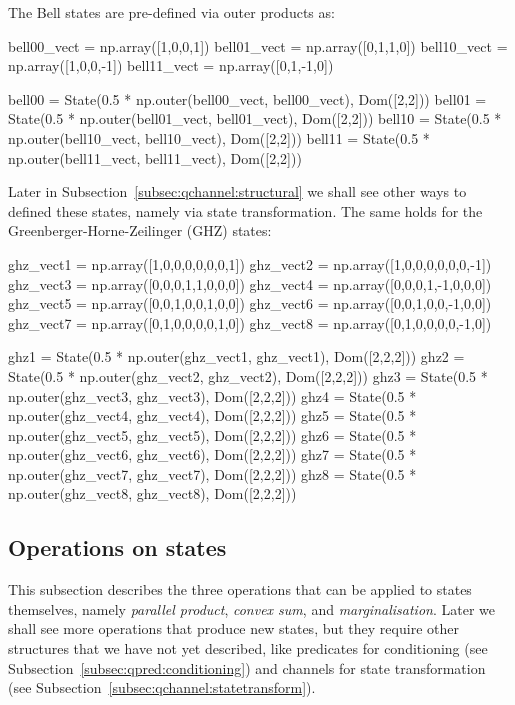 \documentclass[leqno]{tufte-book} %
\begin{document}
\noindent The Bell states are pre-defined via outer
products as:
\begin{python}
bell00_vect = np.array([1,0,0,1])
bell01_vect = np.array([0,1,1,0])
bell10_vect = np.array([1,0,0,-1])
bell11_vect = np.array([0,1,-1,0])

bell00 = State(0.5 * np.outer(bell00_vect, bell00_vect), Dom([2,2]))
bell01 = State(0.5 * np.outer(bell01_vect, bell01_vect), Dom([2,2]))
bell10 = State(0.5 * np.outer(bell10_vect, bell10_vect), Dom([2,2]))
bell11 = State(0.5 * np.outer(bell11_vect, bell11_vect), Dom([2,2]))
\end{python}

\noindent Later in Subsection~\ref{subsec:qchannel:structural} we
shall see other ways to defined these states, namely via state
transformation. The same holds for the Greenberger-Horne-Zeilinger
(GHZ) states:
\begin{python}
ghz_vect1 = np.array([1,0,0,0,0,0,0,1])
ghz_vect2 = np.array([1,0,0,0,0,0,0,-1])
ghz_vect3 = np.array([0,0,0,1,1,0,0,0])
ghz_vect4 = np.array([0,0,0,1,-1,0,0,0])
ghz_vect5 = np.array([0,0,1,0,0,1,0,0])
ghz_vect6 = np.array([0,0,1,0,0,-1,0,0])
ghz_vect7 = np.array([0,1,0,0,0,0,1,0])
ghz_vect8 = np.array([0,1,0,0,0,0,-1,0])

ghz1 = State(0.5 * np.outer(ghz_vect1, ghz_vect1), Dom([2,2,2]))
ghz2 = State(0.5 * np.outer(ghz_vect2, ghz_vect2), Dom([2,2,2]))
ghz3 = State(0.5 * np.outer(ghz_vect3, ghz_vect3), Dom([2,2,2]))
ghz4 = State(0.5 * np.outer(ghz_vect4, ghz_vect4), Dom([2,2,2]))
ghz5 = State(0.5 * np.outer(ghz_vect5, ghz_vect5), Dom([2,2,2]))
ghz6 = State(0.5 * np.outer(ghz_vect6, ghz_vect6), Dom([2,2,2]))
ghz7 = State(0.5 * np.outer(ghz_vect7, ghz_vect7), Dom([2,2,2]))
ghz8 = State(0.5 * np.outer(ghz_vect8, ghz_vect8), Dom([2,2,2]))
\end{python}


\subsection{Operations on states}\label{subsec:qstate:operations}

This subsection describes the three operations that can be applied to
states themselves, namely \emph{parallel product}, \emph{convex sum},
and \emph{marginalisation}.  Later we shall see more operations that
produce new states, but they require other structures that we have not
yet described, like predicates for conditioning (see
Subsection~\ref{subsec:qpred:conditioning}) and channels for state
transformation (see Subsection~\ref{subsec:qchannel:statetransform}).
\end{document}
